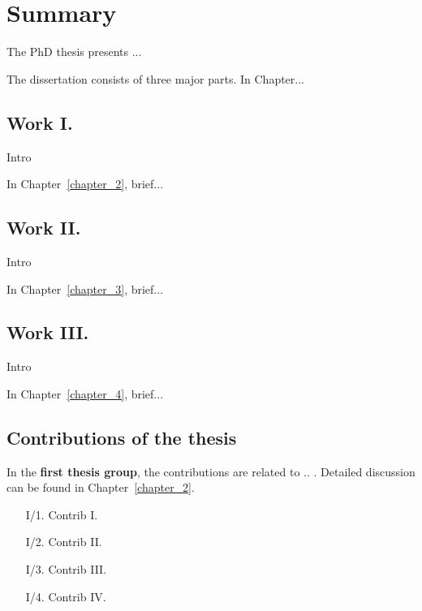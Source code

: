\chapter*{Summary}

The PhD thesis presents ... 

The dissertation consists of three major parts. In Chapter...

\section*{Work I.}

Intro

In Chapter~\ref{chapter_2}, brief...

\section*{Work II.}

Intro

In Chapter~\ref{chapter_3}, brief...

\newpage
\section*{Work III.}

Intro

In Chapter~\ref{chapter_4}, brief...

\vfill
\pagebreak

\section*{Contributions of the thesis}

In the \textbf{first thesis group}, the contributions are related to .. . Detailed discussion can be found in Chapter~\ref{chapter_2}.

\begin{enumerate}[wide = 0pt, widest = {I/4.}, leftmargin =*]
    \item[I/1.] Contrib I.
    
    \item[I/2.] Contrib II.
    
    \item[I/3.] Contrib III.
    
    \item[I/4.] Contrib IV.
\end{enumerate}

\vspace{1cm}

